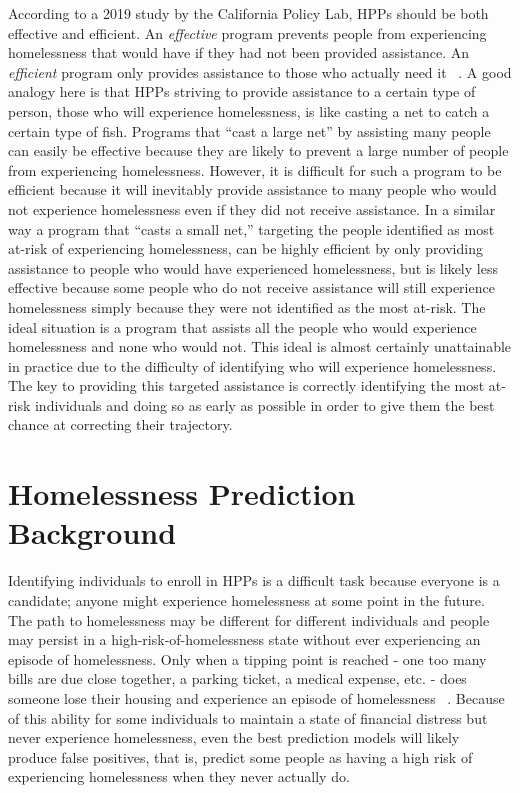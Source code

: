 \documentclass[10pt,letterpaper]{article}
\begin{document}
According to a 2019 study by the California Policy Lab, HPPs should be both effective and efficient. An \textit{effective} program prevents people from experiencing homelessness that would have if they had not been provided assistance. An \textit{efficient} program only provides assistance to those who actually need it ~\cite{PredictPreventHmlsnsLA}. A good analogy here is that HPPs striving to provide assistance to a certain type of person, those who will experience homelessness, is like casting a net to catch a certain type of fish. Programs that ``cast a large net'' by assisting many people can easily be effective because they are likely to prevent a large number of people from experiencing homelessness. However, it is difficult for such a program to be efficient because it will inevitably provide assistance to many people who would not experience homelessness even if they did not receive assistance. In a similar way a program that ``casts a small net,'' targeting the people identified as most at-risk of experiencing homelessness, can be highly efficient by only providing assistance to people who would have experienced homelessness, but is likely less effective because some people who do not receive assistance will still experience homelessness simply because they were not identified as the most at-risk. The ideal situation is a program that assists all the people who would experience homelessness and none who would not. This ideal is almost certainly unattainable in practice due to the difficulty of identifying who will experience homelessness. The key to providing this targeted assistance is correctly identifying the most at-risk individuals and doing so as early as possible in order to give them the best chance at correcting their trajectory.

\section{Homelessness Prediction Background}
Identifying individuals to enroll in HPPs is a difficult task because everyone is a candidate; anyone might experience homelessness at some point in the future. The path to homelessness may be different for different individuals and people may persist in a high-risk-of-homelessness state without ever experiencing an episode of homelessness. Only when a tipping point is reached - one too many bills are due close together, a parking ticket, a medical expense, etc. - does someone lose their housing and experience an episode of homelessness ~\cite{o2004wrong}. Because of this ability for some individuals to maintain a state of financial distress but never experience homelessness, even the best prediction models will likely produce false positives, that is, predict some people as having a high risk of experiencing homelessness when they never actually do.
\end{document}
